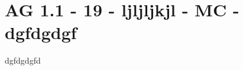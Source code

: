 \section{AG 1.1 - 19 - ljljljkjl - MC - dgfdgdgf}

\begin{beispiel}[AG 1.1]{1}
dgfdgdgfd
\end{beispiel}